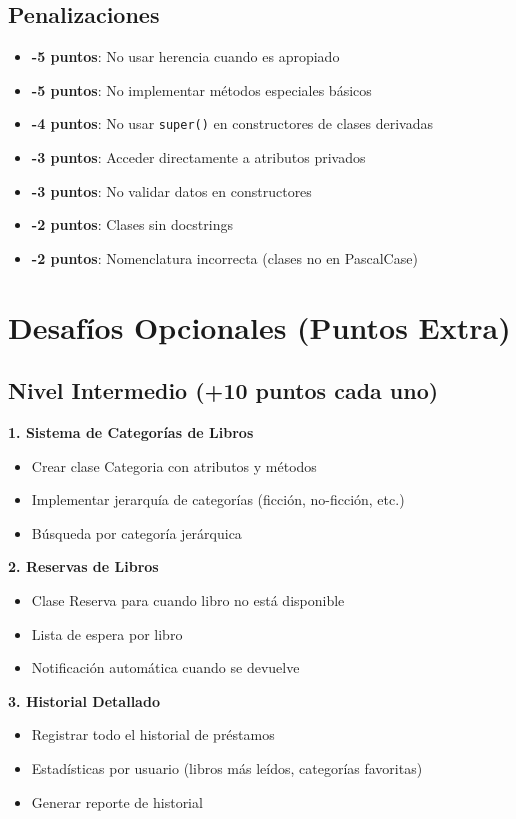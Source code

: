 \documentclass[11pt,letterpaper]{article}
\begin{document}
\subsection{Penalizaciones}

\begin{itemize}
    \item \textbf{-5 puntos}: No usar herencia cuando es apropiado
    \item \textbf{-5 puntos}: No implementar métodos especiales básicos
    \item \textbf{-4 puntos}: No usar \texttt{super()} en constructores de clases derivadas
    \item \textbf{-3 puntos}: Acceder directamente a atributos privados
    \item \textbf{-3 puntos}: No validar datos en constructores
    \item \textbf{-2 puntos}: Clases sin docstrings
    \item \textbf{-2 puntos}: Nomenclatura incorrecta (clases no en PascalCase)
\end{itemize}

\section{Desafíos Opcionales (Puntos Extra)}

\subsection{Nivel Intermedio (+10 puntos cada uno)}

\textbf{1. Sistema de Categorías de Libros}
\begin{itemize}
    \item Crear clase Categoria con atributos y métodos
    \item Implementar jerarquía de categorías (ficción, no-ficción, etc.)
    \item Búsqueda por categoría jerárquica
\end{itemize}

\textbf{2. Reservas de Libros}
\begin{itemize}
    \item Clase Reserva para cuando libro no está disponible
    \item Lista de espera por libro
    \item Notificación automática cuando se devuelve
\end{itemize}

\textbf{3. Historial Detallado}
\begin{itemize}
    \item Registrar todo el historial de préstamos
    \item Estadísticas por usuario (libros más leídos, categorías favoritas)
    \item Generar reporte de historial
\end{itemize}
\end{document}
